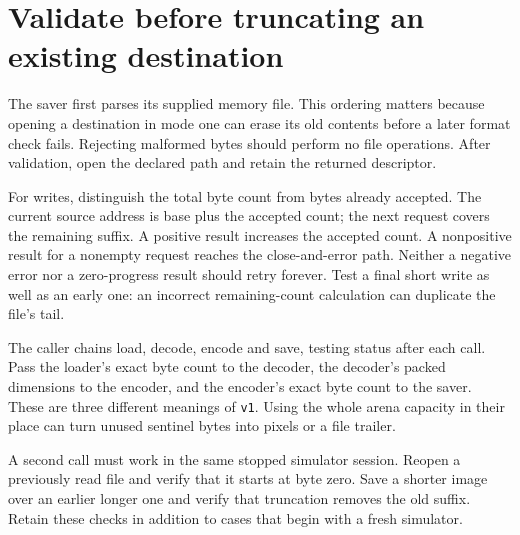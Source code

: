 \section{Validate before truncating an existing destination}
The saver first parses its supplied memory file. This ordering matters because opening
a destination in mode one can erase its old contents before a later format check fails.
Rejecting malformed bytes should perform no file operations. After validation, open the
declared path and retain the returned descriptor.

For writes, distinguish the total byte count from bytes already accepted. The current
source address is base plus the accepted count; the next request covers the remaining
suffix. A positive result increases the accepted count. A nonpositive result for a
nonempty request reaches the close-and-error path. Neither a negative error nor a
zero-progress result should retry forever. Test a final short write as well as an
early one: an incorrect remaining-count calculation can duplicate the file's tail.

The caller chains load, decode, encode and save, testing status after each call. Pass
the loader's exact byte count to the decoder, the decoder's packed dimensions to the
encoder, and the encoder's exact byte count to the saver. These are three different
meanings of \texttt{v1}. Using the whole arena capacity in their place can turn unused
sentinel bytes into pixels or a file trailer.

A second call must work in the same stopped simulator session. Reopen a previously read
file and verify that it starts at byte zero. Save a shorter image over an earlier longer
one and verify that truncation removes the old suffix. Retain these checks in addition
to cases that begin with a fresh simulator.
